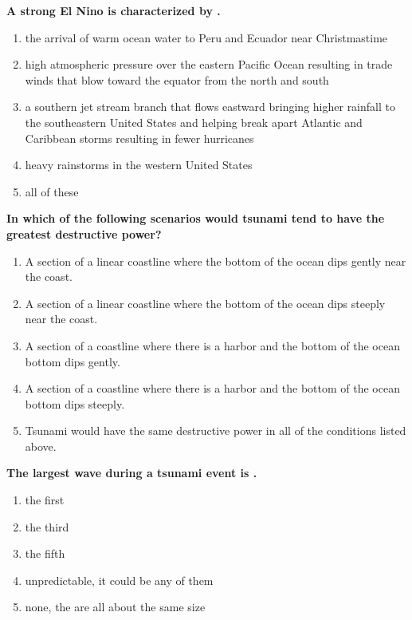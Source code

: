 \item {
\setlength{\itemsep}{0cm}
\setlength{\parskip}{.2cm}
\begin{samepage}
\textbf{
A strong El Nino is characterized by \makebox[1cm]{\Rivpt\hrulefill\Rivpt}.
}
\begin{enumerate}
\item {  the arrival of warm ocean water to Peru and Ecuador near Christmastime }
\item {  high atmospheric pressure over the eastern Pacific Ocean resulting in trade winds that blow toward the equator from the north and south }
\item {  a southern jet stream branch that flows eastward bringing higher rainfall to the southeastern United States and helping break apart Atlantic and Caribbean storms resulting in fewer hurricanes }
\item {  heavy rainstorms in the western United States }
\item {  all of these }
\end{enumerate}
\end{samepage}
}
\item {
\setlength{\itemsep}{0cm}
\setlength{\parskip}{.2cm}
\begin{samepage}
\textbf{
In which of the following scenarios would tsunami tend to have the greatest destructive power?
}
\begin{enumerate}
\item { 	A section of a linear coastline where the bottom of the ocean dips gently near the coast. }
\item { 	A section of a linear coastline where the bottom of the ocean dips steeply near the coast. }
\item { 	A section of a coastline where there is a harbor and the bottom of the ocean bottom dips gently. }
\item { 	A section of a coastline where there is a harbor and the bottom of the ocean bottom dips steeply. }
\item { 	Tsunami would have the same destructive power in all of the conditions listed above. }
\end{enumerate}
\end{samepage}
}
\item {
\setlength{\itemsep}{0cm}
\setlength{\parskip}{.2cm}
\begin{samepage}
\textbf{
The largest wave during a tsunami event is \makebox[1cm]{\Rivpt\hrulefill\Rivpt}.
}
\begin{enumerate}
\item { 	the first }
\item { 	the third }
\item { 	the fifth }
\item { 	unpredictable, it could be any of them }
\item { 	none, the are all about the same size 		 }
\end{enumerate}
\end{samepage}
}
